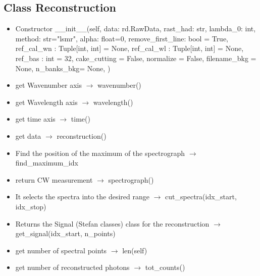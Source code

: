 \documentclass{article}
\begin{document}
\subsection{Class Reconstruction}
\begin{itemize}
\item Constructor \_\_init\_\_(self,
            data: rd.RawData,
            rast\_had: str,
            lambda\_0: int,
            method: str="lsmr",
            alpha: float=0,
            remove\_first\_line: bool = True,
            ref\_cal\_wn : Tuple[int, int] = None,
            ref\_cal\_wl : Tuple[int, int] = None,
            ref\_bas : int = 32,
            cake\_cutting = False,
            normalize = False,
            filename\_bkg = None,
            n\_banks\_bkg= None,
            )
\item get Wavenumber axis $\rightarrow$ wavenumber()
\item get Wavelength axis $\rightarrow$ wavelength()
\item get time axis $\rightarrow$ time()
\item get data $\rightarrow$ reconstruction()
\item Find the position of the maximum of the spectrograph $\rightarrow$ find\_maximum\_idx
\item return CW measurement $\rightarrow$ spectrograph()
\item It selects the spectra into the desired range $\rightarrow$ cut\_spectra(idx\_start, idx\_stop)
\item Returns the Signal (Stefan classes) class for the reconstruction $\rightarrow$  get\_signal(idx\_start, n\_points)
\item get number of spectral points $\rightarrow$ len(self)
\item get number of reconstructed photons $\rightarrow$ tot\_counts()
\end{itemize}
\end{document}
